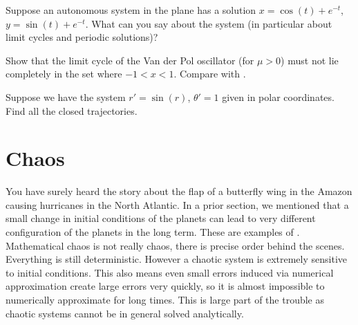 \begin{exercise}
Suppose an autonomous system in the plane has a solution
$x=\cos(t)+e^{-t}$, $y=\sin(t)+e^{-t}$.  What can you say
about the system (in particular about limit cycles and periodic solutions)?
\end{exercise}

\begin{exercise}
Show that the limit cycle
of the 
Van der Pol oscillator (for $\mu > 0$) must not lie completely in the set
where 
$-1 < x < 1$.
Compare with .
\end{exercise}

\begin{exercise}
Suppose we have the system $r' = \sin(r)$, $\theta' = 1$ given
in polar coordinates.  Find all the closed trajectories.
\end{exercise}



\sectionnewpage
\section{Chaos} \label{sec:chaos}


You have surely heard the story about the
flap of a butterfly wing in the Amazon causing hurricanes in the North
Atlantic.  In a prior section, we mentioned that a small change in
initial conditions of the planets can lead to very different configuration
of the planets in the long term.  These are examples of
\emph{}.
Mathematical chaos is not really chaos, there is precise order behind the
scenes.  Everything is still deterministic.  However a chaotic system is extremely
sensitive to initial conditions.  This also means even small errors induced 
via numerical approximation create large errors very quickly, so it is
almost impossible to numerically approximate for long times.
This is large part of
the trouble as chaotic systems cannot be in general solved analytically.

